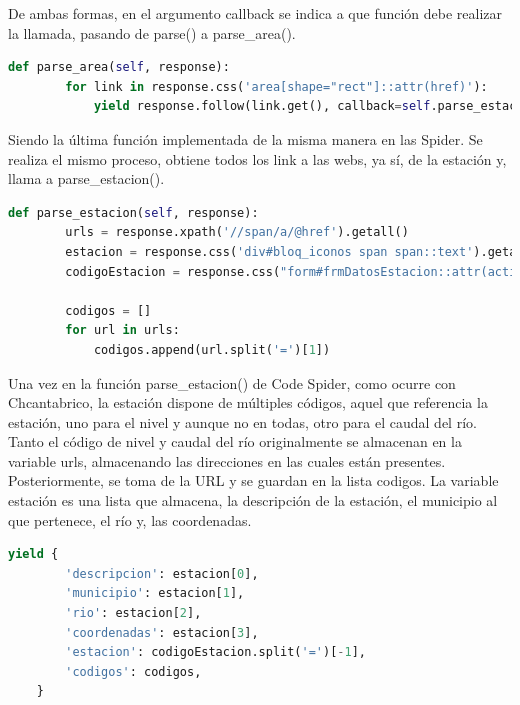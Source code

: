De ambas formas, en el argumento callback se indica a que función debe realizar la llamada, pasando de parse() a parse\_area().

\begin{lstlisting}[language=Python, caption={Función parse\_area() Agua en Navarra Spiders}]
	def parse_area(self, response):
		for link in response.css('area[shape="rect"]::attr(href)'):
			yield response.follow(link.get(), callback=self.parse_estacion)
\end{lstlisting}

Siendo la última función implementada de la misma manera en las Spider. Se realiza el mismo proceso, obtiene todos los link a las webs, ya sí, de la estación y, llama a parse\_estacion().

\begin{lstlisting}[language=Python, caption={Función parse\_estacion() Agua en Navarra Code Spider}]
	def parse_estacion(self, response):
		urls = response.xpath('//span/a/@href').getall()
		estacion = response.css('div#bloq_iconos span span::text').getall()
		codigoEstacion = response.css("form#frmDatosEstacion::attr(action)").get()
		
		codigos = []
		for url in urls:
			codigos.append(url.split('=')[1])
\end{lstlisting}

Una vez en la función parse\_estacion() de Code Spider, como ocurre con Chcantabrico, la estación dispone de múltiples códigos, aquel que referencia la estación, uno para el nivel y aunque no en todas, otro para el caudal del río.\newline
\newline
Tanto el código de nivel y caudal del río originalmente se almacenan en la variable urls, almacenando las direcciones en las cuales están presentes. Posteriormente, se toma de la URL y se guardan en la lista codigos.\newline
\newline
La variable estación es una lista que almacena, la descripción de la estación, el municipio al que pertenece, el río y, las coordenadas.

\begin{lstlisting}[language=Python, caption={Guardado de datos de Agua en Navarra Code Spider}]
	yield {
		'descripcion': estacion[0],
		'municipio': estacion[1],
		'rio': estacion[2],
		'coordenadas': estacion[3],
		'estacion': codigoEstacion.split('=')[-1],
		'codigos': codigos,
	}
\end{lstlisting}

